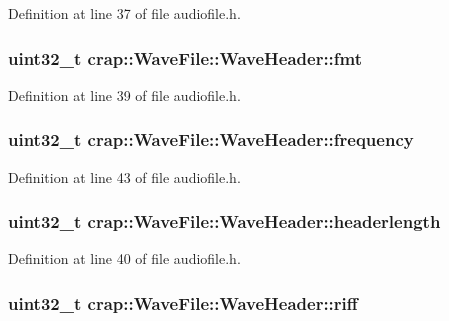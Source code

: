 Definition at line 37 of file audiofile.\+h.

\hypertarget{structcrap_1_1_wave_file_1_1_wave_header_a41722bd15601783d2587b233acb2e33b}{
\subsubsection[{fmt}]{\setlength{\rightskip}{0pt plus 5cm}uint32\+\_\+t crap\+::\+Wave\+File\+::\+Wave\+Header\+::fmt}}\label{structcrap_1_1_wave_file_1_1_wave_header_a41722bd15601783d2587b233acb2e33b}


Definition at line 39 of file audiofile.\+h.

\hypertarget{structcrap_1_1_wave_file_1_1_wave_header_ad069c28d60b7f89e6d2be429ad4b0347}{
\subsubsection[{frequency}]{\setlength{\rightskip}{0pt plus 5cm}uint32\+\_\+t crap\+::\+Wave\+File\+::\+Wave\+Header\+::frequency}}\label{structcrap_1_1_wave_file_1_1_wave_header_ad069c28d60b7f89e6d2be429ad4b0347}


Definition at line 43 of file audiofile.\+h.

\hypertarget{structcrap_1_1_wave_file_1_1_wave_header_a9b09473da66dc65a81f3af08246cc7b4}{
\subsubsection[{headerlength}]{\setlength{\rightskip}{0pt plus 5cm}uint32\+\_\+t crap\+::\+Wave\+File\+::\+Wave\+Header\+::headerlength}}\label{structcrap_1_1_wave_file_1_1_wave_header_a9b09473da66dc65a81f3af08246cc7b4}


Definition at line 40 of file audiofile.\+h.

\hypertarget{structcrap_1_1_wave_file_1_1_wave_header_abf32e05680132afe847f29671bd0b039}{
\subsubsection[{riff}]{\setlength{\rightskip}{0pt plus 5cm}uint32\+\_\+t crap\+::\+Wave\+File\+::\+Wave\+Header\+::riff}}\label{structcrap_1_1_wave_file_1_1_wave_header_abf32e05680132afe847f29671bd0b039}


